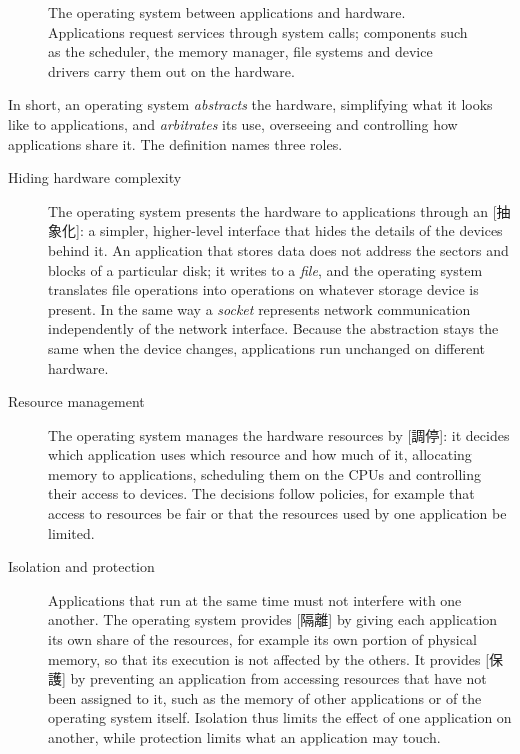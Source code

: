 \documentclass[../main.tex]{subfiles}
\begin{document}
\begin{figure}[htbp]
  \centering
  
  \caption{The operating system between applications and hardware.
    Applications request services through system calls; components such
    as the scheduler, the memory manager, file systems and device drivers
    carry them out on the hardware.}
  \label{fig:l01-os-layers}
\end{figure}

In short, an operating system \emph{abstracts} the hardware, simplifying
what it looks like to applications, and \emph{arbitrates} its use,
overseeing and controlling how applications share it.  The definition
names three roles.
\begin{description}
  \item[Hiding hardware complexity] The operating system presents the
    hardware to applications through an
    [抽象化]: a simpler, higher-level interface that
    hides the details of the devices behind it.  An application that
    stores data does not address the sectors and blocks of a particular
    disk; it writes to a \emph{file}, and the operating system translates
    file operations into operations on whatever storage device is
    present.  In the same way a \emph{socket} represents network
    communication independently of the network interface.  Because the
    abstraction stays the same when the device changes, applications run
    unchanged on different hardware.
  \item[Resource management] The operating system manages the hardware
    resources by [調停]: it decides which application
    uses which resource and how much of it, allocating memory to
    applications, scheduling them on the CPUs and controlling their access
    to devices.  The decisions follow policies, for example that access
    to resources be fair or that the resources used by one application be
    limited.
  \item[Isolation and protection] Applications that run at the same time
    must not interfere with one another.  The operating system provides
    [隔離] by giving each application its own share of the
    resources, for example its own portion of physical memory, so that its
    execution is not affected by the others.  It provides
    [保護] by preventing an application from accessing
    resources that have not been assigned to it, such as the memory of
    other applications or of the operating system itself.  Isolation thus
    limits the effect of one application on another, while protection
    limits what an application may touch.
\end{description}
\end{document}
